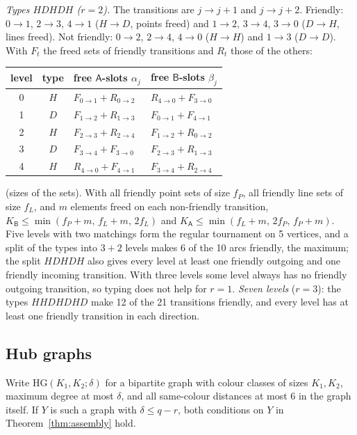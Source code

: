 \documentclass[11pt]{amsart}
\theoremstyle{definition}
\theoremstyle{remark}
\numberwithin{equation}{section}
\begin{document}
\emph{Types $HDHDH$ ($r=2$).} The transitions are $j\to j+1$ and $j\to j+2$. Friendly: $0\to1$, $2\to3$, $4\to1$ ($H\to D$,
points freed) and $1\to2$, $3\to4$, $3\to0$ ($D\to H$, lines freed). Not friendly: $0\to2$, $2\to4$, $4\to0$ ($H\to H$) and
$1\to3$ ($D\to D$). With $F_t$ the freed sets of friendly transitions and $R_t$ those of the others:
\begin{center}
\begin{tabular}{@{}c c l l@{}}
\toprule level & type & free $\mathsf A$-slots $\alpha_j$ & free $\mathsf B$-slots $\beta_j$\\ \midrule
0 & $H$ & $F_{0\to1}+R_{0\to2}$ & $R_{4\to0}+F_{3\to0}$\\
1 & $D$ & $F_{1\to2}+R_{1\to3}$ & $F_{0\to1}+F_{4\to1}$\\
2 & $H$ & $F_{2\to3}+R_{2\to4}$ & $F_{1\to2}+R_{0\to2}$\\
3 & $D$ & $F_{3\to4}+F_{3\to0}$ & $F_{2\to3}+R_{1\to3}$\\
4 & $H$ & $R_{4\to0}+F_{4\to1}$ & $F_{3\to4}+R_{2\to4}$\\ \bottomrule
\end{tabular}
\end{center}
(sizes of the sets). With all friendly point sets of size $f_P$, all friendly line sets of size $f_L$, and $m$ elements freed
on each non-friendly transition, $K_{\mathsf B}\le\min(f_P+m,\,f_L+m,\,2f_L)$ and $K_{\mathsf A}\le\min(f_L+m,\,2f_P,\,f_P+m)$.
Five levels with two matchings form the regular tournament on 5 vertices, and a split of the types into $3+2$ levels makes
6 of the 10 arcs friendly, the maximum; the split $HDHDH$ also gives every level at least one friendly outgoing and one
friendly incoming transition. With three levels some level always has no friendly outgoing transition, so typing does not
help for $r=1$. \emph{Seven levels} ($r=3$): the types $HHDHDHD$ make 12 of the 21 transitions friendly, and every level has
at least one friendly transition in each direction.

\subsection{Hub graphs}\label{ssec:hubgraphs}
Write $\mathrm{HG}(K_1,K_2;\delta)$ for a bipartite graph with colour classes of sizes $K_1,K_2$, maximum degree at most
$\delta$, and all same-colour distances at most 6 in the graph itself. If $Y$ is such a graph with $\delta\le q-r$, both
conditions on $Y$ in Theorem~\ref{thm:assembly} hold.
\end{document}
